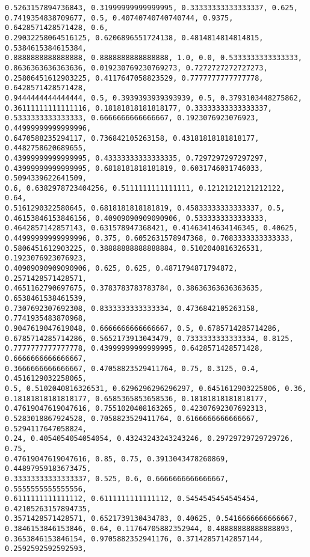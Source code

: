 \documentclass[11pt]{article}
\begin{document}
\begin{Verbatim}[commandchars=\\\{\}]
0.5263157894736843, 0.31999999999999995, 0.33333333333333337, 0.625,
0.7419354838709677, 0.5, 0.40740740740740744, 0.9375, 0.6428571428571428, 0.6,
0.29032258064516125, 0.6206896551724138, 0.4814814814814815, 0.5384615384615384,
0.8888888888888888, 0.8888888888888888, 1.0, 0.0, 0.5333333333333333,
0.8636363636363636, 0.019230769230769273, 0.7272727272727273,
0.25806451612903225, 0.4117647058823529, 0.7777777777777778, 0.6428571428571428,
0.9444444444444444, 0.5, 0.3939393939393939, 0.5, 0.3793103448275862,
0.36111111111111116, 0.18181818181818177, 0.33333333333333337,
0.5333333333333333, 0.6666666666666667, 0.1923076923076923, 0.44999999999999996,
0.6470588235294117, 0.736842105263158, 0.43181818181818177, 0.4482758620689655,
0.43999999999999995, 0.43333333333333335, 0.7297297297297297,
0.43999999999999995, 0.6818181818181819, 0.6031746031746033, 0.5094339622641509,
0.6, 0.6382978723404256, 0.5111111111111111, 0.12121212121212122, 0.64,
0.5161290322580645, 0.6818181818181819, 0.45833333333333337, 0.5,
0.46153846153846156, 0.40909090909090906, 0.5333333333333333,
0.4642857142857143, 0.631578947368421, 0.41463414634146345, 0.40625,
0.44999999999999996, 0.375, 0.6052631578947368, 0.7083333333333333,
0.5806451612903225, 0.38888888888888884, 0.5102040816326531, 0.1923076923076923,
0.40909090909090906, 0.625, 0.625, 0.4871794871794872, 0.2571428571428571,
0.4651162790697675, 0.3783783783783784, 0.38636363636363635, 0.6538461538461539,
0.7307692307692308, 0.8333333333333334, 0.4736842105263158, 0.7741935483870968,
0.9047619047619048, 0.6666666666666667, 0.5, 0.6785714285714286,
0.6785714285714286, 0.5652173913043479, 0.7333333333333334, 0.8125,
0.7777777777777778, 0.43999999999999995, 0.6428571428571428, 0.6666666666666667,
0.3666666666666667, 0.47058823529411764, 0.75, 0.3125, 0.4, 0.4516129032258065,
0.5, 0.5102040816326531, 0.6296296296296297, 0.6451612903225806, 0.36,
0.18181818181818177, 0.6585365853658536, 0.18181818181818177,
0.47619047619047616, 0.7551020408163265, 0.42307692307692313,
0.5283018867924528, 0.7058823529411764, 0.6166666666666667, 0.5294117647058824,
0.24, 0.4054054054054054, 0.43243243243243246, 0.29729729729729726, 0.75,
0.47619047619047616, 0.85, 0.75, 0.3913043478260869, 0.44897959183673475,
0.33333333333333337, 0.525, 0.6, 0.6666666666666667, 0.5555555555555556,
0.6111111111111112, 0.6111111111111112, 0.5454545454545454, 0.42105263157894735,
0.3571428571428571, 0.6521739130434783, 0.40625, 0.5416666666666667,
0.3846153846153846, 0.64, 0.11764705882352944, 0.48888888888888893,
0.3653846153846154, 0.9705882352941176, 0.37142857142857144, 0.2592592592592593,

\end{Verbatim}
\end{document}
